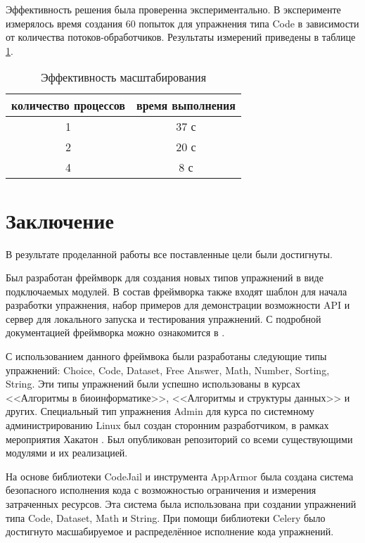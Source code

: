 \documentclass{matmex-diploma-custom}
\begin{document}
Эффективность решения была проверенна экспериментально. В эксперименте
измерялось время создания 60 попыток для упражнения типа Code в
зависимости от количества потоков-обработчиков. Результаты измерений
приведены в таблице \ref{table:scal}.

\begin{table}[h]
  \centering
\begin{tabular}{|c|c|}
  \hline
  количество процессов & время выполнения \\
  \hline
  1 & 37 с \\
  2 & 20 с \\
  4 & 8 с \\
  \hline
\end{tabular}
  \caption{Эффективность масштабирования}
  \label{table:scal}
\end{table}

\iffalse
#+ORGTBL: SEND scal orgtbl-to-latex :splice nil :skip 0
|----------------------+------------------|
| количество процессов | время выполнения |
|----------------------+------------------|
|                    1 | 37 с             |
|                    2 | 20 с             |
|                    4 | 8 с              |
|----------------------+------------------|
\fi


\section*{Заключение}
В результате проделанной работы все поставленные цели были достигнуты.

Был разработан фреймворк для создания новых типов упражнений в виде
подключаемых модулей. В состав фреймворка также входят шаблон для
начала разработки упражнения, набор примеров для демонстрации
возможности API и сервер для локального запуска и тестирования
упражнений. С подробной документацией фреймворка можно ознакомится в
\cite{plugins:doc}.

С использованием данного фреймвока были разработаны следующие типы
упражнений: Choice, Code, Dataset, Free Answer, Math, Number, Sorting,
String. Эти типы упражнений были успешно использованы в курсах
<<Алгоритмы в биоинформатике>>, <<Алгоритмы и структуры данных>> и
других. Специальный тип упражнения Admin для курса по системному
администрированию Linux был создан сторонним разработчиком, в рамках
мероприятия Хакатон \cite{hackathon}. Был опубликован репозиторий со
всеми существующими модулями \cite{plugins:repo} и их реализацией.

На основе библиотеки CodeJail и инструмента AppArmor была создана
система безопасного исполнения кода с возможностью ограничения и
измерения затраченных ресурсов. Эта система была использована при
создании упражнений типа Code, Dataset, Math и String. При помощи
библиотеки Celery было достигнуто масшабируемое и распределённое
исполнение кода упражнений.

\clearpage {}
 
\end{document}

